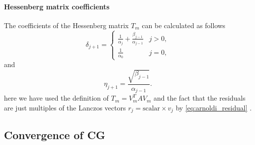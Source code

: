 \paragraph{Hessenberg matrix coefficients} The coefficients of the Hessenberg matrix $T_m$ can be calculated as follows
\begin{equation}
  \delta_{j+1} =
  \begin{cases}
    \frac{1}{\alpha_j} + \frac{\beta_{j-1}}{\alpha_{j-1}} & j > 0, \\
    \frac{1}{\alpha_0}                                    & j = 0,
  \end{cases}
  \label{eq:cg_hessenberg_delta}
\end{equation}
and
\begin{equation}
  \eta_{j+1} = \frac{\sqrt{\beta_{j-1}}}{\alpha_{j-1}}.
  \label{eq:cg_hessenberg_eta}
\end{equation}
here we have used the definition of $T_m = V_m^T A V_m$ and the fact that the residuals are just multiples of the Lanczos vectors $r_j = \text{scalar} \times v_j$ by \cref{eq:arnoldi_residual} \cite[Equation 6.103]{iter_method_saad}.

\subsection{Convergence of CG}
